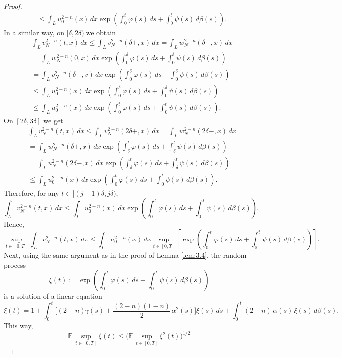 \documentclass[10pt,a4paper]{amsart}
\begin{document}
\begin{proof}
\begin{align*}
& \leq \int_{L} u_0^{2-n}(x)\,dx
\exp\left( \int_0^t \varphi(s)\,ds + \int_0^t \psi(s)\,d\beta(s) \right).
\end{align*}
In a similar way, on $[\delta,2\delta)$ we obtain
\begin{align*}
& \int_{L} v_N^{2-n}(t,x)\,dx \le \int_{L} v_N^{2-n}(\delta+,x)\,dx = \int_{L} w_N^{2-n}(\delta-,x)\,dx  \\
& = \int_{L} w_N^{2-n}(0,x)\,dx
\exp\left( \int_0^\delta \varphi(s)\,ds + \int_0^\delta \psi(s)\,d\beta(s) \right)\\ 
& =  \int_{L} v_N^{2-n}(\delta-,x)\,dx
\exp\left( \int_0^\delta \varphi(s)\,ds + \int_0^\delta \psi(s)\,d\beta(s) \right)\\
& \le \int_{L} u_0^{2-n}(x)\,dx
\exp\left( \int_0^\delta \varphi(s)\,ds + \int_0^\delta \psi(s)\,d\beta(s) \right) \\
& \le \int_{L} u_0^{2-n}(x)\,dx
\exp\left( \int_0^t \varphi(s)\,ds + \int_0^t \psi(s)\,d\beta(s) \right).
\end{align*}
On $[2\delta,3\delta]$ we get
\begin{align*}
& \int_{L} v_N^{2-n}(t,x)\,dx \le \int_{L} v_N^{2-n}(2\delta+,x)\,dx = \int_{L} w_N^{2-n}(2\delta-,x)\,dx  \\
& = \int_{L} w_N^{2-n}(\delta+,x)\,dx
\exp\left( \int_\delta^t \varphi(s)\,ds + \int_\delta^t \psi(s)\,d\beta(s) \right)\\ 
& =  \int_{L} u_N^{2-n}(2\delta-,x)\,dx
\exp\left( \int_\delta^t \varphi(s)\,ds + \int_\delta^t \psi(s)\,d\beta(s) \right)\\
& \le \int_{L} u_0^{2-n}(x)\,dx
\exp\left( \int_0^t \varphi(s)\,ds + \int_0^t \psi(s)\,d\beta(s) \right).
\end{align*}
Therefore, for any $t \in [(j-1)\delta, j\delta)$,
\[
\int_{L} v_N^{2-n}(t,x)\,dx
\le
\int_{L} u_0^{2-n}(x)\,dx
\exp\left( \int_0^t \varphi(s)\,ds + \int_0^t \psi(s)\,d\beta(s) \right).
\]
Hence,
\[
\sup_{t \in [0,T]}
\int_{L} v_N^{2-n}(t,x)\,dx
\le
\int_{L} u_0^{2-n}(x)\,dx
\sup_{t \in [0,T]}\left[
\exp\left( \int_0^t \varphi(s)\,ds + \int_0^t \psi(s)\,d\beta(s) \right) \right].
\]
Next, using the same argument as in the proof of Lemma \ref{lem:3.4}, the random process
\[
\xi(t)
:=
\exp\left(
\int_0^t \varphi(s)\,ds
+
\int_0^t \psi(s)\,d\beta(s)
\right)
\]
is a solution of a linear equation
\[
\xi(t)
= 1
+ \int_{0}^{t}
\Big[
(2-n) \gamma(s)
+ \frac{(2-n)(1-n)}{2}\,\alpha^2(s)
\Big] \xi(s)\,ds
+ \int_{0}^{t} (2-n)\, \alpha(s) \,\xi(s)\,d\beta(s).
\]
This way,
\[
\mathbb{E}\,\sup_{t\in[0,T]} \xi(t)
\le
\Big(\mathbb{E}\,\sup_{t\in[0,T]} \xi^2(t)\Big)^{1/2}
\]
\end{proof}
\end{document}
